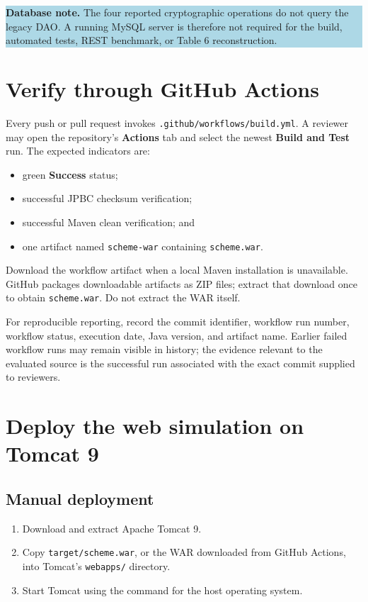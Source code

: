 \documentclass[11pt,a4paper]{article}
\newcommand{\statusbox}[1]{%
  \begingroup\setlength{\fboxsep}{8pt}%
  \colorbox{lightblue}{\parbox{0.94\linewidth}{#1}}%
  \endgroup
}
\begin{document}
\statusbox{\textbf{Database note.} The four reported cryptographic operations do not query the legacy DAO. A running MySQL server is therefore not required for the build, automated tests, REST benchmark, or Table 6 reconstruction.}

\section{Verify through GitHub Actions}

Every push or pull request invokes \texttt{.github/workflows/build.yml}. A reviewer may open the repository's \textbf{Actions} tab and select the newest \textbf{Build and Test} run. The expected indicators are:

\begin{itemize}
  \item green \textbf{Success} status;
  \item successful JPBC checksum verification;
  \item successful Maven clean verification; and
  \item one artifact named \texttt{scheme-war} containing \texttt{scheme.war}.
\end{itemize}

Download the workflow artifact when a local Maven installation is unavailable. GitHub packages downloadable artifacts as ZIP files; extract that download once to obtain \texttt{scheme.war}. Do not extract the WAR itself.

For reproducible reporting, record the commit identifier, workflow run number, workflow status, execution date, Java version, and artifact name. Earlier failed workflow runs may remain visible in history; the evidence relevant to the evaluated source is the successful run associated with the exact commit supplied to reviewers.

\section{Deploy the web simulation on Tomcat 9}

\subsection{Manual deployment}

\begin{enumerate}
  \item Download and extract Apache Tomcat 9.
  \item Copy \texttt{target/scheme.war}, or the WAR downloaded from GitHub Actions, into Tomcat's \texttt{webapps/} directory.
  \item Start Tomcat using the command for the host operating system.
\end{enumerate}
\end{document}
